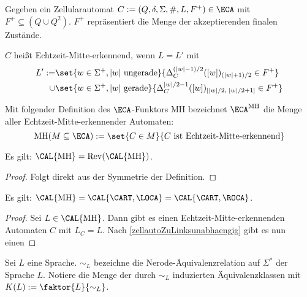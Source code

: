 

\newcommand{\CAMH}{\textrm{MH}}

\begin{definition}
    Gegeben ein Zellularautomat $C := (Q, \delta, \Sigma, \#, L, F^+) \in \ECA$
    mit $F^+ \subseteq (Q \cup Q^2)$.
    $F^+$ repräsentiert die Menge der akzeptierenden finalen Zustände.
    
    $C$ heißt Echtzeit-Mitte-erkennend, wenn $L = L'$ mit
    \begin{align*}
        L' := & \set{ w \in \Sigma^+, |w| \textrm{ ungerade} }{ \Delta_C^{(|w| - 1) / 2}([w])_{(|w| + 1) / 2} \in F^+ } \\
     \cup & \set{ w \in \Sigma^+, |w| \textrm{ gerade} }{ \Delta_C^{|w| / 2 - 1}([w])_{[|w| / 2, \; |w| / 2 + 1]} \in F^+ }
    \end{align*}
    
    Mit folgender Definition des $\ECA$-Funktors $\CAMH$ bezeichnet $\ECA^\CAMH$ die Menge aller Echtzeit-Mitte-erkennender Automaten:
    \[
        \CAMH(M \subseteq \ECA) := \set{ C \in M }{ C \text{ ist Echtzeit-Mitte-erkennend} }
    \]
\end{definition}



\begin{proposition}
    Es gilt: $\CAL{\CAMH} = \operatorname{Rev}(\CAL{\CAMH})$.
\end{proposition}
\begin{proof}
    Folgt direkt aus der Symmetrie der Definition.
\end{proof}

\begin{satz}
    Es gilt: $\CAL{\CAMH} = \CAL{\CART, \LOCA} = \CAL{\CART, \ROCA}$.
\end{satz}
\begin{proof}
    Sei $L \in \CAL{\CAMH}$. Dann gibt es einen Echtzeit-Mitte-erkennenden Automaten $C$ mit $L_C = L$.
    Nach \cref{zellautoZuLinksunabhaengig} gibt es nun einen 
\end{proof}




\begin{definition}
    Sei $L$ eine Sprache. $\sim_L$ bezeichne die Nerode-Äquivalenzrelation auf $\Sigma^*$ der Sprache $L$.
    Notiere die Menge der durch $\sim_L$ induzierten Äquivalenzklassen mit $K(L) := \faktor{L}{\sim_L}$.
\end{definition}

